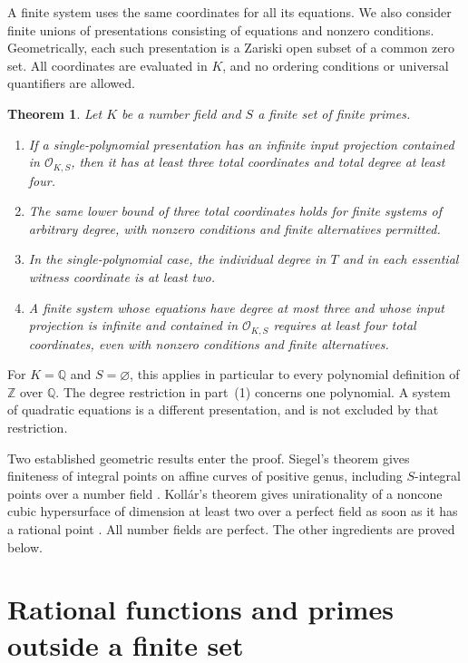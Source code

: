 \documentclass[11pt,a4paper]{article}
\newtheorem{theorem}{Theorem}[section]
\theoremstyle{definition}
\newcommand{\OKS}{\mathcal O_{K,S}}
\begin{document}
A finite system uses the same coordinates for all its equations.
We also consider finite unions of presentations consisting of equations
and nonzero conditions. Geometrically, each such presentation is a
Zariski open subset of a common zero set. All coordinates are evaluated
in $K$, and no ordering conditions or universal quantifiers are allowed.

\begin{samepage}
\begin{theorem}\label{lb:main}
Let $K$ be a number field and $S$ a finite set of finite primes.
\begin{enumerate}
\item If a single-polynomial presentation has an infinite input
projection contained in $\OKS$, then it has at least three total
coordinates and total degree at least four.
\item The same lower bound of three total coordinates holds for
finite systems of arbitrary degree, with nonzero conditions and finite
alternatives permitted.
\item In the single-polynomial case, the individual degree in $T$
and in each essential witness coordinate is at least two.
\item A finite system whose equations have degree at most three
and whose input projection is infinite and contained in $\OKS$
requires at least four total coordinates, even with nonzero
conditions and finite alternatives.
\end{enumerate}
\end{theorem}
\end{samepage}

For $K=\mathbb Q$ and $S=\varnothing$, this applies in particular
to every polynomial definition of $\mathbb Z$ over $\mathbb Q$.
The degree restriction in part~(1) concerns one polynomial. A system
of quadratic equations is a different presentation, and is not
excluded by that restriction.

Two established geometric results enter the proof. Siegel's theorem
gives finiteness of integral points on affine curves of positive
genus, including $S$-integral points over a number field
\cite[Chapter~8]{Lang}. Koll\'ar's theorem gives unirationality of a
noncone cubic hypersurface of dimension at least two over a perfect
field as soon as it has a rational point \cite[Theorem~2]{Kollar}.
All number fields are perfect. The other ingredients are proved below.

\section{Rational functions and primes outside a finite set}
\end{document}
